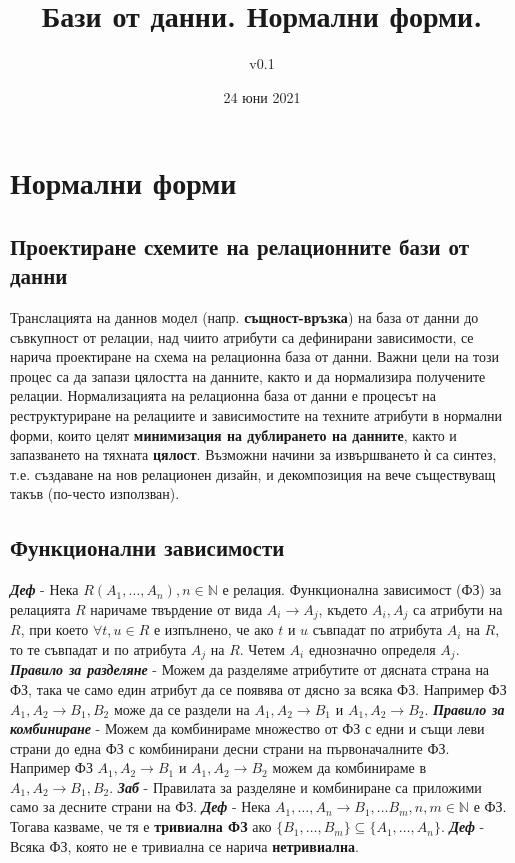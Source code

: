 \documentclass[fleqn,12pt]{article}
\title{Бази от данни. Нормални форми.}
\author{v0.1}
\date{24 юни 2021}
\begin{document}
\maketitle
\tableofcontents
\pagebreak


\section{Нормални форми}
\subsection{Проектиране схемите на релационните бази от данни}

Транслацията на даннов модел (напр. \textbf{същност-връзка}) на база от данни до съвкупност от релации, над чиито атрибути са дефинирани зависимости, се нарича проектиране на схема на релационна база от данни.
Важни цели на този процес са да запази цялостта на данните, както и да нормализира получените релации.
\bigbreak
Нормализацията на релационна база от данни е процесът на реструктуриране на релациите и зависимостите на техните атрибути в нормални форми, които целят \textbf{минимизация на дублирането на данните}, както и запазването на тяхната \textbf{цялост}.
Възможни начини за извършването ѝ са синтез, т.е. създаване на нов релационен дизайн, и декомпозиция на вече съществуващ такъв (по-често използван).

\subsection{Функционални зависимости}

\textbf{\textit{Деф}} - Нека $R(A_1, \dots, A_n), n \in \mathbb{N}$ е релация.
Функционална зависимост (ФЗ) за релацията $R$ наричаме твърдение от вида $A_i \rightarrow A_j$, където $A_i, A_j$ са атрибути на $R$, при което $\forall t, u \in R$ е изпълнено, че ако $t$ и $u$ съвпадат по атрибута $A_i$ на $R$, то те съвпадат и по атрибута $A_j$ на $R$.
Четем $A_i$ еднозначно определя $A_j$.
\bigbreak
\textbf{\textit{Правило за разделяне}} - Можем да разделяме атрибутите от дясната страна на ФЗ, така че само един атрибут да се появява от дясно за всяка ФЗ.
Например ФЗ $A_1, A_2 \rightarrow B_1, B_2$ може да се раздели на $A_1, A_2 \rightarrow B_1$ и $A_1, A_2 \rightarrow B_2$.
\bigbreak
\textbf{\textit{Правило за комбиниране}} - Можем да комбинираме множество от ФЗ с едни и същи леви страни до една ФЗ с комбинирани десни страни на първоначалните ФЗ.
Например ФЗ $A_1, A_2 \rightarrow B_1$ и $A_1, A_2 \rightarrow B_2$ можем да комбинираме в $A_1, A_2 \rightarrow B_1, B_2$.
\bigbreak
\textbf{\textit{Заб}} - Правилата за разделяне и комбиниране са приложими само за десните страни на ФЗ.
\bigbreak
\textbf{\textit{Деф}} - Нека $A_1, \dots, A_n \rightarrow B_1, \dots B_m, n, m \in \mathbb{N}$ е ФЗ.
Тогава казваме, че тя е \textbf{тривиална ФЗ} ако $\{B_1, \dots, B_m\} \subseteq \{A_1, \dots, A_n\}$.
\bigbreak
\textbf{\textit{Деф}} - Всяка ФЗ, която не е тривиална се нарича \textbf{нетривиална}.
\end{document}
